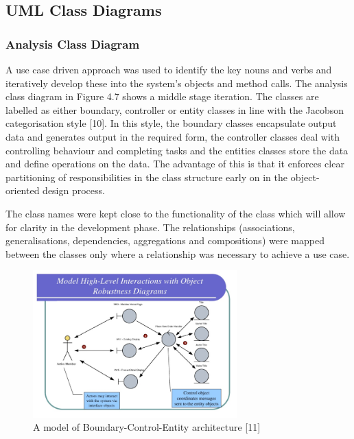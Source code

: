 \hypertarget{uml-class-diagrams}{%
\subsection{UML Class Diagrams}\label{uml-class-diagrams}}

\hypertarget{analysis-class-diagram}{%
\subsubsection{Analysis Class Diagram}\label{analysis-class-diagram}}

A use case driven approach was used to identify the key nouns and verbs
and iteratively develop these into the system's objects and method
calls. The analysis class diagram in Figure 4.7 shows a middle stage
iteration. The classes are labelled as either boundary, controller or
entity classes in line with the Jacobson categorisation style {[}10{]}.
In this style, the boundary classes encapsulate output data and
generates output in the required form, the controller classes deal with
controlling behaviour and completing tasks and the entities classes
store the data and define operations on the data. The advantage of this
is that it enforces clear partitioning of responsibilities in the class
structure early on in the object-oriented design process.

The class names were kept close to the functionality of the class which
will allow for clarity in the development phase. The relationships
(associations, generalisations, dependencies, aggregations and
compositions) were mapped between the classes only where a relationship
was necessary to achieve a use case.

\begin{figure}[H]
      \centering
      \includegraphics[trim = 0 0 0 0, clip, width=0.7\textwidth]{TempImg/OOClass.png}
      \caption{A model of Boundary-Control-Entity architecture [11]}
 \end{figure}

